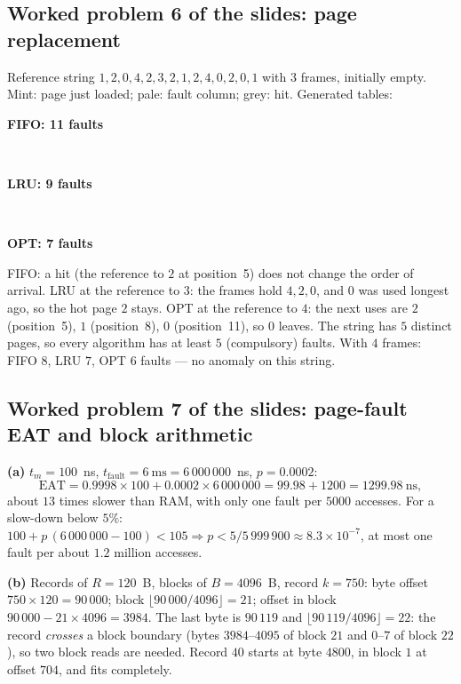 \documentclass[11pt,a4paper]{article}
\begin{document}
\subsection{Worked problem 6 of the slides: page replacement}
Reference string $1, 2, 0, 4, 2, 3, 2, 1, 2, 4, 0, 2, 0, 1$ with $3$ frames, initially empty. Mint: page just loaded; pale: fault column; grey: hit. Generated tables:

\begin{center}
\begin{minipage}{\linewidth}\centering\textbf{FIFO: 11 faults}\\[0.2em]\end{minipage}\\[0.8em]
\begin{minipage}{\linewidth}\centering\textbf{LRU: 9 faults}\\[0.2em]\end{minipage}\\[0.8em]
\begin{minipage}{\linewidth}\centering\textbf{OPT: 7 faults}\\[0.2em]\end{minipage}
\end{center}
FIFO: a hit (the reference to $2$ at position~5) does not change the order of arrival. LRU at the reference to $3$: the frames hold $4, 2, 0$, and $0$ was used longest ago, so the hot page $2$ stays. OPT at the reference to $4$: the next uses are $2$ (position~5), $1$ (position~8), $0$ (position~11), so $0$ leaves. The string has $5$ distinct pages, so every algorithm has at least $5$ (compulsory) faults. With $4$ frames: FIFO $8$, LRU $7$, OPT $6$ faults --- no anomaly on this string.

\subsection{Worked problem 7 of the slides: page-fault EAT and block arithmetic}
\textbf{(a)} $t_m = 100$~ns, $t_{\text{fault}} = 6\ \text{ms} = 6\,000\,000$~ns, $p = 0.0002$:
\[
\text{EAT} = 0.9998 \times 100 + 0.0002 \times 6\,000\,000 = 99.98 + 1200 = 1299.98\ \text{ns},
\]
about $13$ times slower than RAM, with only one fault per $5000$ accesses. For a slow-down below $5\%$: $100 + p\,(6\,000\,000 - 100) < 105 \Rightarrow p < 5/5\,999\,900 \approx 8.3\times10^{-7}$, at most one fault per about $1.2$ million accesses.

\textbf{(b)} Records of $R = 120$~B, blocks of $B = 4096$~B, record $k = 750$: byte offset $750 \times 120 = 90\,000$; block $\lfloor 90\,000/4096\rfloor = 21$; offset in block $90\,000 - 21 \times 4096 = 3984$. The last byte is $90\,119$ and $\lfloor 90\,119/4096\rfloor = 22$: the record \emph{crosses} a block boundary (bytes $3984$--$4095$ of block $21$ and $0$--$7$ of block $22$), so two block reads are needed. Record $40$ starts at byte $4800$, in block $1$ at offset $704$, and fits completely.
\end{document}
